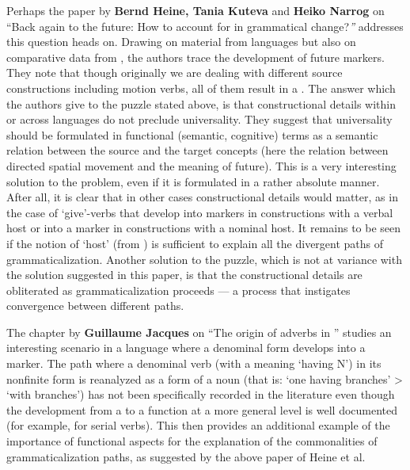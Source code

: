 \documentclass[output=paper]{LSP/langsci}
\begin{document}
Perhaps the paper by \textbf{Bernd Heine, Tania Kuteva} and \textbf{Heiko Narrog} on “Back again to the future: How to account for  in grammatical change?\textit{”} addresses this question heads on. Drawing on material from  languages but also on comparative data from , the authors trace the development of future markers. They note that though originally we are dealing with different source constructions including motion verbs, all of them result in a . The answer which the authors give to the puzzle stated above, is that constructional details within or across languages do not preclude universality. They suggest that universality should be formulated in functional (semantic, cognitive) terms as a semantic relation between the source and the target concepts (here the relation between directed spatial movement and the meaning of future). This is a very interesting solution to the problem, even if it is formulated in a rather absolute manner. After all, it is clear that in other cases constructional details would matter, as in the case of ‘give’-verbs that develop into  markers in constructions with a verbal host or into a  marker in constructions with a nominal host. It remains to be seen if the notion of ‘host’ (from \citealt{Himmelmann2004}) is sufficient to explain all the divergent paths of grammaticalization. Another solution to the puzzle, which is not at variance with the solution suggested in this paper, is that the constructional details are obliterated as grammaticalization proceeds — a process that instigates convergence between different paths.

The chapter by \textbf{Guillaume Jacques} on “The origin of  adverbs in ” studies an interesting scenario in a  language where a  denominal form develops into a  marker. The path where a denominal  verb (with a meaning ‘having N’) in its nonfinite form is reanalyzed as a  form of a noun (that is: ‘one having branches’ > ‘with branches’) has not been specifically recorded in the literature even though the development from a  to a  function at a more general level is well documented (for example, for serial verbs). This then provides an additional example of the importance of functional aspects for the explanation of the commonalities of grammaticalization paths, as suggested by the above paper of Heine et al.
\end{document}
